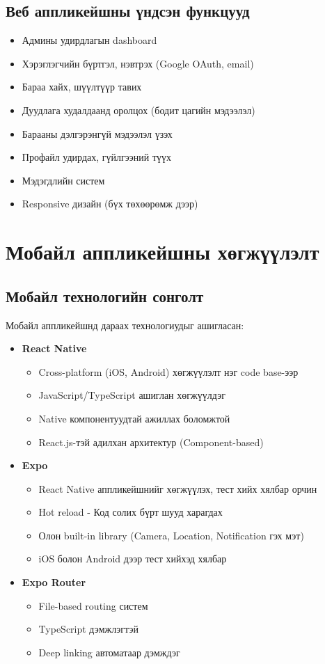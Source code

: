 \subsection{Веб аппликейшны үндсэн функцууд}
\begin{itemize}
    \item Админы удирдлагын dashboard
    \item Хэрэглэгчийн бүртгэл, нэвтрэх (Google OAuth, email)
    \item Бараа хайх, шүүлтүүр тавих
    \item Дуудлага худалдаанд оролцох (бодит цагийн мэдээлэл)
    \item Барааны дэлгэрэнгүй мэдээлэл үзэх
    \item Профайл удирдах, гүйлгээний түүх
    \item Мэдэгдлийн систем
    \item Responsive дизайн (бүх төхөөрөмж дээр)
\end{itemize}

 \section{Мобайл аппликейшны хөгжүүлэлт}
\subsection{Мобайл технологийн сонголт}
Мобайл аппликейшнд дараах технологиудыг ашигласан:
\begin{itemize}
    \item \textbf{React Native}
    \begin{itemize}
   \item Cross-platform (iOS, Android) хөгжүүлэлт нэг code base-ээр
   \item JavaScript/TypeScript ашиглан хөгжүүлдэг
   \item Native компонентуудтай ажиллах боломжтой
   \item React.js-тэй адилхан архитектур (Component-based)
\end{itemize}
    \item \textbf{Expo}
    \begin{itemize}
   \item React Native аппликейшнийг хөгжүүлэх, тест хийх хялбар орчин
   \item Hot reload - Код солих бүрт шууд харагдах
   \item Олон built-in library (Camera, Location, Notification гэх мэт)
   \item iOS болон Android дээр тест хийхэд хялбар
\end{itemize}
    \item \textbf{Expo Router}
    \begin{itemize}
   \item File-based routing систем
   \item TypeScript дэмжлэгтэй
   \item Deep linking автоматаар дэмждэг
\end{itemize}
\end{itemize}

